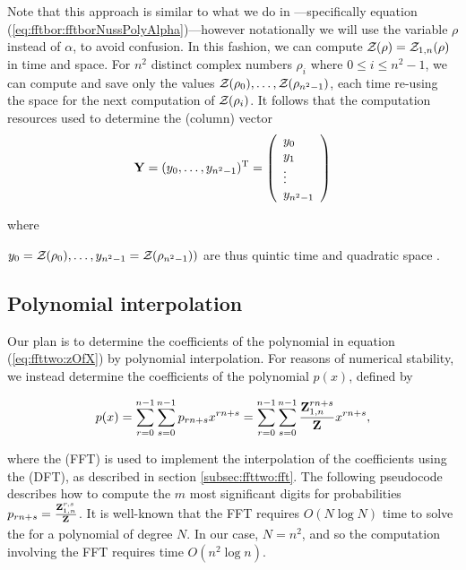 Note that this approach is similar to what we do in \fftbor---specifically
equation
(\ref{eq:fftbor:fftborNussPolyAlpha})---however notationally we will use the
variable $\rho$ instead of $\alpha$, to avoid confusion. In this fashion, we
can compute ${\mathcal Z}_{}(\rho)={\mathcal Z}_{1,n}(\rho)$ in
 time and  space. For $n^2$ distinct complex numbers
$\rho_i$ where $0 \leq i \leq n^2-1$, we can compute and save only the
values ${\mathcal Z}_{}(\rho_0),\dots,{\mathcal Z}_{}(\rho_{n^2-1})$, each time re-using the
 space for the next computation of ${\mathcal Z}_{}(\rho_i)$.
It follows that
the computation resources used to determine the (column) vector
\begin{align}
\label{eq:ffttwo:yColumn}
\bfY = (y_0,\dots,y_{n^2-1})^{\text T} =
\left(
\begin{array}{l}
y_0 \\
y_1 \\
\vdots \\
y_{n^2-1} \\
\end{array}
\right)
\end{align}

where

$y_0={\mathcal Z}_{}(\rho_0),\dots,y_{n^2-1}={\mathcal Z}_{}(\rho_{n^2-1}))$ are thus
quintic time  and quadratic space .

\subsection{Polynomial interpolation}
Our plan is to determine the coefficients of the polynomial
\emZ{} in equation (\ref{eq:ffttwo:zOfX}) by
polynomial interpolation.  For reasons of numerical stability,
we instead determine the coefficients of the polynomial $p(x)$,
defined by

\begin{align}
\label{eq:ffttwo:pOfX}
p(x) =
\sum_{r=0}^{n-1} \sum_{s=0}^{n-1} p_{rn+s}
 x^{rn+s} =
\sum_{r=0}^{n-1} \sum_{s=0}^{n-1} \frac{\bfZ{rn+s}{1,n}}{\bfZ{}{}}
 x^{rn+s},
\end{align}

where the \fft (FFT) is used to implement the
interpolation of
the coefficients using the \idft (DFT), as
described in section \ref{subsec:ffttwo:fft}.  The following pseudocode
describes how
to compute the $m$ most significant digits
for probabilities
$p_{rn+s} = \frac{{\bf Z}^{r,s}_{1,n}}{{\bf Z}^{}_{}}$. It is well-known that
the FFT requires $O(N \log N)$ time to solve the \idft for a polynomial
of degree $N$. In our case,
$N=n^2$, and so the computation involving the FFT requires time $O(n^2 \log n)$.

